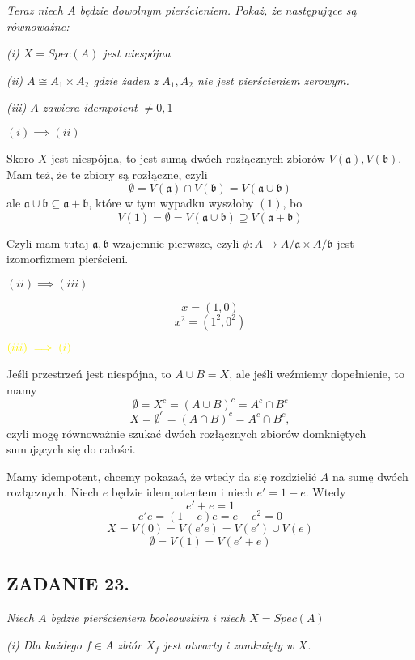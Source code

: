 \documentclass{article}
\begin{document}
\emph{\color{pink}Teraz niech $A$ będzie dowolnym pierścieniem. Pokaż, że następujące są równoważne:}

\emph{(i) $X=Spec(A)$ jest niespójna}

\emph{(ii) $A\cong A_1\times A_2$ gdzie żaden z $A_1,A_2$ nie jest pierścieniem zerowym.}

\emph{(iii) $A$ zawiera idempotent $\neq0,1$}
\medskip

$(i)\implies (ii)$

Skoro $X$ jest niespójna, to jest sumą dwóch rozłącznych zbiorów $V(\mathfrak{a}), V(\mathfrak{b})$.  Mam też, że te zbiory są rozłączne, czyli
$$\emptyset=V(\mathfrak{a})\cap V(\mathfrak{b})=V(\mathfrak{a}\cup\mathfrak{b})$$
ale $\mathfrak{a}\cup\mathfrak{b}\subseteq\mathfrak{a}+\mathfrak{b}$, które w tym wypadku wyszłoby $(1)$, bo
$$V(1)=\emptyset=V(\mathfrak{a}\cup\mathfrak{b})\supseteq V(\mathfrak{a}+\mathfrak{b})$$

Czyli mam tutaj $\mathfrak{a},\mathfrak{b}$ wzajemnie pierwsze, czyli $\phi:A\to A/\mathfrak{a}\times A/\mathfrak{b}$ jest izomorfizmem pierścieni.

$(ii)\implies (iii)$

$$x=(1, 0)$$
$$x^2=(1^2, 0^2)$$

$\color{yellow}(iii)\implies(i)$

Jeśli przestrzeń jest niespójna, to $A\cup B=X$, ale jeśli weźmiemy dopełnienie, to mamy 
$$\emptyset=X^c=(A\cup B)^c=A^c\cap B^c$$
$$X=\emptyset^c=(A\cap B)^c=A^c\cap B^c,$$ czyli mogę równoważnie szukać dwóch rozłącznych zbiorów domkniętych sumujących się do całości.

Mamy idempotent, chcemy pokazać, że wtedy da się rozdzielić $A$ na sumę dwóch rozłącznych. Niech $e$ będzie idempotentem i niech $e'=1-e$. Wtedy
$$e'+e=1$$
$$e'e=(1-e)e=e-e^2=0$$
$$X=V(0)=V(e'e)=V(e')\cup V(e)$$
$$\emptyset=V(1)=V(e'+e)$$

\subsection*{ZADANIE 23.}
\emph{\color{pink}Niech $A$ będzie pierścieniem booleowskim i niech $X=Spec(A)$}

\emph{\color{orange}(i) Dla każdego $f\in A$ zbiór $X_f$ jest otwarty i zamknięty w $X$.}
\end{document}
